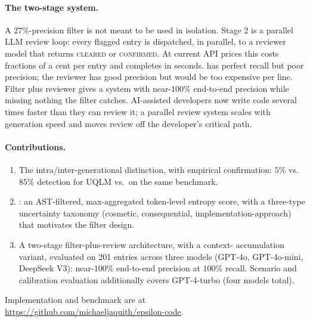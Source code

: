 \paragraph{The two-stage system.}
A $27\%$-precision filter is not meant to be used in isolation. Stage 2
is a parallel LLM review loop: every flagged entry is dispatched, in
parallel, to a reviewer model that returns \textsc{cleared} or
\textsc{confirmed}. At current API prices this costs fractions of a cent
per entry and completes in seconds. \eps has perfect recall but poor
precision; the reviewer has good precision but would be too expensive per
line. Filter plus reviewer gives a system with near-$100\%$ end-to-end
precision while missing nothing the filter catches. AI-assisted developers
now write code several times faster than they can review it; a parallel
review system scales with generation speed and moves review off the
developer's critical path.

\paragraph{Contributions.}
\begin{enumerate}[noitemsep]
    \item The intra/inter-generational distinction, with empirical
    confirmation: $5\%$ vs.\ $85\%$ detection for UQLM vs.\ \eps on the
    same benchmark.
    \item \eps: an AST-filtered, max-aggregated token-level entropy score,
    with a three-type uncertainty taxonomy (cosmetic, consequential,
    implementation-approach) that motivates the filter design.
    \item A two-stage filter-plus-review architecture, with a context-%
    accumulation variant, evaluated on 201 entries across three models
    (GPT-4o, GPT-4o-mini, DeepSeek V3): near-$100\%$ end-to-end
    precision at $100\%$ recall. Scenario and calibration evaluation
    additionally covers GPT-4-turbo (four models total).
\end{enumerate}

Implementation and benchmark are at
\url{https://github.com/michaeljaquith/epsilon-code}.
